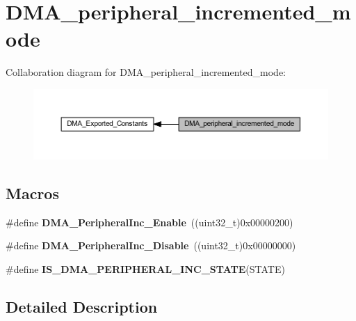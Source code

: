 \hypertarget{group___d_m_a__peripheral__incremented__mode}{}\section{D\+M\+A\+\_\+peripheral\+\_\+incremented\+\_\+mode}
\label{group___d_m_a__peripheral__incremented__mode}
Collaboration diagram for D\+M\+A\+\_\+peripheral\+\_\+incremented\+\_\+mode\+:\nopagebreak
\begin{figure}[H]
\begin{center}
\leavevmode
\includegraphics[width=350pt]{group___d_m_a__peripheral__incremented__mode}
\end{center}
\end{figure}
\subsection*{Macros}
\begin{DoxyCompactItemize}
\item 
\mbox{\label{group___d_m_a__peripheral__incremented__mode_gaf7921ea423fb60701a091c508cd0f33a}} 
\#define {\bfseries D\+M\+A\+\_\+\+Peripheral\+Inc\+\_\+\+Enable}~((uint32\+\_\+t)0x00000200)
\item 
\mbox{\label{group___d_m_a__peripheral__incremented__mode_ga0fe3ff9c67bec802dd239fd17c3dbd31}} 
\#define {\bfseries D\+M\+A\+\_\+\+Peripheral\+Inc\+\_\+\+Disable}~((uint32\+\_\+t)0x00000000)
\item 
\#define {\bfseries I\+S\+\_\+\+D\+M\+A\+\_\+\+P\+E\+R\+I\+P\+H\+E\+R\+A\+L\+\_\+\+I\+N\+C\+\_\+\+S\+T\+A\+TE}(S\+T\+A\+TE)
\end{DoxyCompactItemize}


\subsection{Detailed Description}


